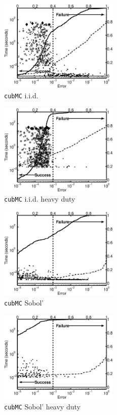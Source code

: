 \documentclass[graybox]{svmult}
\begin{document}
\begin{figure}
\begin{minipage}{5.7cm} \centering \includegraphics[width=5.7cm]{gaussiand=1iidErrTime.eps} \\ {\tt cubMC} i.i.d. \end{minipage}
\begin{minipage}{5.7cm} \centering \includegraphics[width=5.7cm]{gaussiand=1iidheavyErrTime.eps} \\ {\tt cubMC} i.i.d. heavy duty\end{minipage}
\begin{minipage}{5.7cm} \centering \includegraphics[width=5.7cm]{gaussiand=1SobolErrTime.eps} \\ {\tt cubMC}  Sobol'\end{minipage}
\begin{minipage}{5.7cm} \centering \includegraphics[width=5.7cm]{gaussiand=1SobolheavyErrTime.eps} \\ {\tt cubMC} Sobol' heavy duty \end{minipage}

\end{figure}
\end{document}
